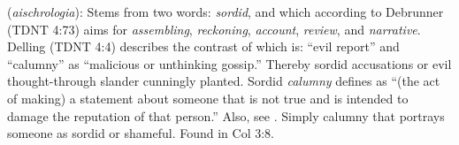 \item[Sordid calumny,]

(\textit{aischrologia}):
Stems from two words:  \emph{sordid}, and  which according to Debrunner (TDNT 4:73) aims for \emph{assembling}, \emph{reckoning}, \emph{account}, \emph{review}, and \emph{narrative}. Delling (TDNT 4:4) describes the contrast of  which is: ``evil report'' and ``calumny'' as ``malicious or unthinking gossip.'' Thereby sordid accusations or evil thought-through slander cunningly planted. Sordid \emph{calumny} defines as ``(the act of making) a statement about someone that is not true and is intended to damage the reputation of that person.'' Also, see . Simply calumny that portrays someone as sordid or shameful.
Found in Col 3:8.
